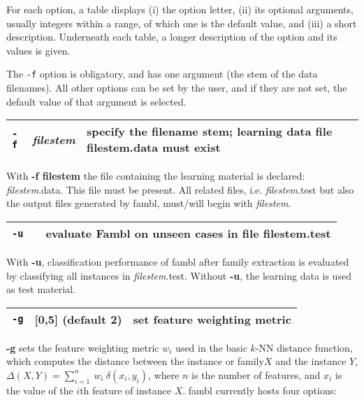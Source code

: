 \documentclass[11pt]{article}
\begin{document}
For each option, a table displays (i) the option letter, (ii) its
optional arguments, usually integers within a range, of which
one is the default value, and (iii) a short description. Underneath each
table, a longer description of the option and its values is given.

The {\tt -f} option is obligatory, and has one argument (the stem of
the data filenames). All other options can be set by the user, and                                                                                      if
they are not set, the default value of that argument is selected.
\ \\


\begin{tabular}{|p{}|p{}|p{}|}
\hline
{\tt -f} & {\sl filestem} & specify the filename stem; learning data 
file filestem.data must exist \\
\hline
\end{tabular}

With {\bf -f filestem} the file containing the learning material is
declared: {\sl filestem}.data. This file must be present. All related
files, i.e. {\sl filestem}.test but also the output files generated by
{\sc fambl}, must/will begin with {\sl filestem}.  
\ \\

\begin{tabular}{|p{}|p{}|p{}|}
\hline
{\tt -u} & & evaluate Fambl on unseen cases in file filestem.test \\
\hline
\end{tabular}

With {\bf -u}, classification performance of {\sc fambl} after family
extraction is evaluated by classifying all instances in {\sl
filestem}.test. Without {\bf -u}, the learning data is used as test
material.  
\ \\

\begin{tabular}{|p{}|p{}|p{}|}
\hline
{\tt -g} & [0,5] (default 2) & set feature weighting metric \\
\hline
\end{tabular}

{\bf -g} sets the feature weighting metric $w_{i}$ used in the basic
$k$-NN distance function, which computes the distance between the
instance or family$X$ and the instance $Y$, $\Delta(X,Y) =
\sum_{i=1}^{n}\ w_{i}\ \delta(x_{i},y_{i})$, where $n$ is the number
of features, and $x_{i}$ is the value of the $i$th feature of instance
$X$. {\sc fambl} currently hosts four options:
\end{document}
